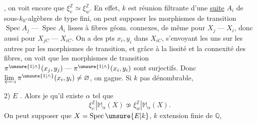 , on voit encore que
$\xi_v^{\mathbb Z}\simeq\xi_w^{\mathbb Z}$. En effet, $k$ est réunion filtrante
d'une \uline{suite} $A_i$ de sous-$k_0$-algèbres de type
fini, on peut supposer les morphismes
de transition $\operatorname{Spec}A_j\mathrel{\text{---}}\operatorname{Spec}A_i$
lisses à fibres géom. connexes, de même
pour $X_j\mathrel{\text{---}}X_i$, donc aussi pour $X_{jC}\mathrel{\text{---}}X_{iC}$.
On a des pts $x_i,y_i$ dans $X_{iC}$, s'envoyant
les uns sur les autres par les
morphismes de transition, et grâce à
la lissité et la connexité des fibres,
on voit que les morphismes de
transition $\pi^{\unsure{1|\wedge}}(x_j,y_j)\mathrel{\text{---}}\pi^{\unsure{1|\wedge}}(x_i,y_i)$ sont
surjectifs. Donc $\varprojlim_i\pi^{\unsure{1|\wedge}}(x_i,y_i)\ne\varnothing$,
on gagne.
Si $k$ pas dénombrable,

2) $E$ .
Alors je  qu'il existe $\alpha$ tel que
\[
\xi_v^{\mathbb Z}|\mathbb M_\alpha(X)\not\simeq\xi_w^{\mathbb Z}|\mathbb M_\alpha(X).
\]
On peut supposer que $X=\operatorname{Spec}\unsure{E|k}$, $k$ extension
finie de $\mathbb Q$, 

